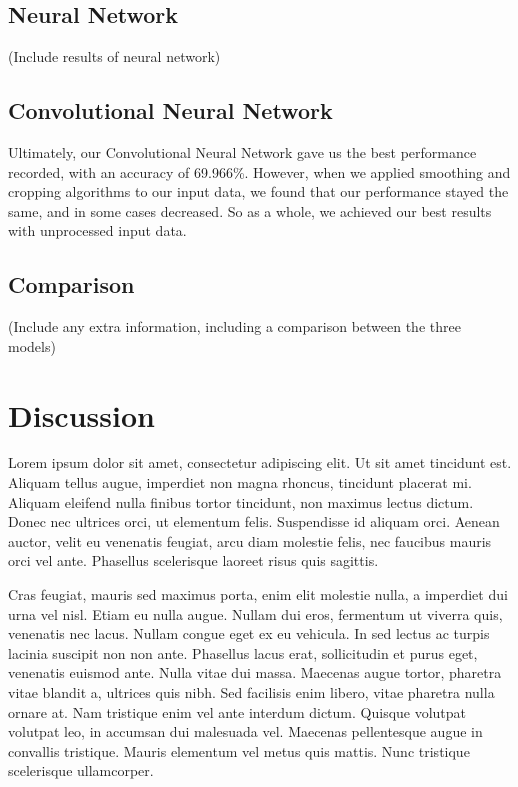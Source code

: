 \documentclass[conference]{IEEEtran}
\begin{document}
\subsection{Neural Network}
(Include results of neural network)

\subsection{Convolutional Neural Network}

Ultimately, our Convolutional Neural Network gave us the best performance recorded, with an accuracy of 69.966\%. However, when we applied smoothing and cropping algorithms to our input data, we found that our performance stayed the same, and in some cases decreased. So as a whole, we achieved our best results with unprocessed input data.

\subsection{Comparison}
(Include any extra information, including a comparison between the three models)

\section{Discussion}

Lorem ipsum dolor sit amet, consectetur adipiscing elit. Ut sit amet tincidunt est. Aliquam tellus augue, imperdiet non magna rhoncus, tincidunt placerat mi. Aliquam eleifend nulla finibus tortor tincidunt, non maximus lectus dictum. Donec nec ultrices orci, ut elementum felis. Suspendisse id aliquam orci. Aenean auctor, velit eu venenatis feugiat, arcu diam molestie felis, nec faucibus mauris orci vel ante. Phasellus scelerisque laoreet risus quis sagittis.

Cras feugiat, mauris sed maximus porta, enim elit molestie nulla, a imperdiet dui urna vel nisl. Etiam eu nulla augue. Nullam dui eros, fermentum ut viverra quis, venenatis nec lacus. Nullam congue eget ex eu vehicula. In sed lectus ac turpis lacinia suscipit non non ante. Phasellus lacus erat, sollicitudin et purus eget, venenatis euismod ante. Nulla vitae dui massa. Maecenas augue tortor, pharetra vitae blandit a, ultrices quis nibh. Sed facilisis enim libero, vitae pharetra nulla ornare at. Nam tristique enim vel ante interdum dictum. Quisque volutpat volutpat leo, in accumsan dui malesuada vel. Maecenas pellentesque augue in convallis tristique. Mauris elementum vel metus quis mattis. Nunc tristique scelerisque ullamcorper.
\end{document}
